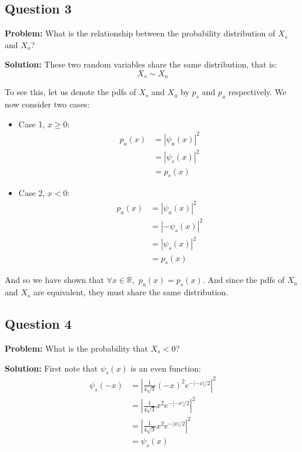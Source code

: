 \documentclass{article}
\begin{document}
\subsection*{Question 3}
\noindent\textbf{Problem:} What is the relationship between the probability distribution of $X_{s}$ and $X_{a}$?
\bigskip

\noindent\textbf{Solution:} These two random variables share the same distribution, that is:
$$X_{s}\sim X_{a}$$

To see this, let us denote the pdfs of $X_s$ and $X_a$ by $p_s$ and $p_a$ respectively. We now consider two cases:

\begin{itemize}
    \item Case 1, $x\ge0$:
    \begin{align*}
        p_a(x)&=|\psi_a(x)|^2\tag{pdf of a wavefunction}\\
        &=|\psi_s(x)|^2\tag{def. of $\psi_a(x)$ for $x\ge0$}\\
        &=p_s(x)\tag{pdf of a wavefunction}
    \end{align*}
    \item Case 2, $x<0$:
    \begin{align*}
        p_a(x)&=|\psi_a(x)|^2\tag{pdf of a wavefunction}\\
        &=|-\psi_s(x)|^2\tag{def. of $\psi_a(x)$ for $x<0$}\\
        &=|\psi_s(x)|^2\tag{modulus is invariant to sign}\\
        &=p_s(x)\tag{pdf of a wavefunction}
    \end{align*}
\end{itemize}

And so we have shown that $\forall x\in\mathbb R,\,\, p_a(x)=p_s(x)$. And since the pdfs of $X_a$ and $X_s$ are equivalent, they must share the same distribution.
\newpage

\subsection*{Question 4}
\noindent\textbf{Problem:} What is the probability that $X_s<0$?
\bigskip

\noindent\textbf{Solution:} First note that $\psi_s(x)$ is an even function:
\begin{align*}
    \psi_s(-x)&=\left|\frac{1}{4\sqrt{3}}(-x)^2e^{-|-x|/2}\right|^2\tag{def. of $\psi_s$}\\
    &=\left|\frac{1}{4\sqrt{3}}x^2e^{-|-x|/2}\right|^2\tag{$x^2=(-x)^2$}\\
    &=\left|\frac{1}{4\sqrt{3}}x^2e^{-|x|/2}\right|^2\tag{$|x|=|-x|$}\\
    &=\psi_s(x)\tag{def. of $\psi_s$}
\end{align*}
\end{document}
